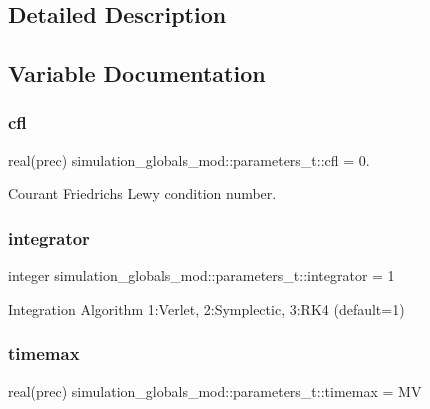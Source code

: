 \subsection{Detailed Description}


\subsection{Variable Documentation}
\mbox{\label{group___k_e_y_w_o_r_d_s_ga63d8108183b786ec9acf16af2164bda1}} 
\subsubsection{\texorpdfstring{cfl}{cfl}}
{\footnotesize\ttfamily real(prec) simulation\+\_\+globals\+\_\+mod\+::parameters\+\_\+t\+::cfl = 0.\hspace{0.3cm}{\ttfamily [private]}}



Courant Friedrichs Lewy condition number. 

\mbox{\label{group___k_e_y_w_o_r_d_s_ga4e57d5a1897acaf67eb14e39e3e0cf21}} 
\subsubsection{\texorpdfstring{integrator}{integrator}}
{\footnotesize\ttfamily integer simulation\+\_\+globals\+\_\+mod\+::parameters\+\_\+t\+::integrator = 1\hspace{0.3cm}{\ttfamily [private]}}



Integration Algorithm 1\+:Verlet, 2\+:Symplectic, 3\+:R\+K4 (default=1) 

\mbox{\label{group___k_e_y_w_o_r_d_s_gad09359247decb284f0ec62e1b9a817b0}} 
\subsubsection{\texorpdfstring{timemax}{timemax}}
{\footnotesize\ttfamily real(prec) simulation\+\_\+globals\+\_\+mod\+::parameters\+\_\+t\+::timemax = MV\hspace{0.3cm}{\ttfamily [private]}}



